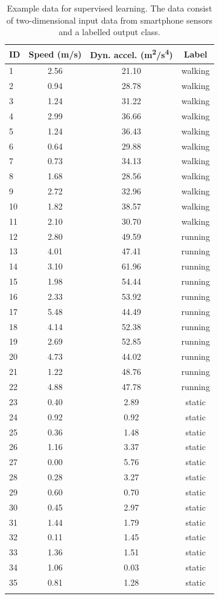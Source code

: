\begin{table}
\centering
\begin{tabular}{lccc}
\hline\noalign{\smallskip}
\textbf{ID} & \textbf{Speed (m/s)} & \textbf{Dyn. accel. (m\textsuperscript{2}/s\textsuperscript{4})} & \textbf{Label}\\
\hline\noalign{\smallskip}
1 & 2.56 & 21.10 & walking\\
2 & 0.94 & 28.78 & walking\\
3 & 1.24 & 31.22 & walking\\
4 & 2.99 & 36.66 & walking\\
5 & 1.24 & 36.43 & walking\\
6 & 0.64 & 29.88 & walking\\
7 & 0.73 & 34.13 & walking\\
8 & 1.68 & 28.56 & walking\\
9 & 2.72 & 32.96 & walking\\
10 & 1.82 & 38.57 & walking\\
11 & 2.10 & 30.70 & walking\\
12 & 2.80 & 49.59 & running\\
13 & 4.01 & 47.41 & running\\
14 & 3.10 & 61.96 & running\\
15 & 1.98 & 54.44 & running\\
16 & 2.33 & 53.92 & running\\
17 & 5.48 & 44.49 & running\\
18 & 4.14 & 52.38 & running\\
19 & 2.69 & 52.85 & running\\
20 & 4.73 & 44.02 & running\\
21 & 1.22 & 48.76 & running\\
22 & 4.88 & 47.78 & running\\
23 & 0.40 & 2.89 & static\\
24 & 0.92 & 0.92 & static\\
25 & 0.36 & 1.48 & static\\
26 & 1.16 & 3.37 & static\\
27 & 0.00 & 5.76 & static\\
28 & 0.28 & 3.27 & static\\
29 & 0.60 & 0.70 & static\\
30 & 0.45 & 2.97 & static\\
31 & 1.44 & 1.79 & static\\
32 & 0.11 & 1.45 & static\\
33 & 1.36 & 1.51 & static\\
34 & 1.06 & 0.03 & static\\
35 & 0.81 & 1.28 & static\\
\hline\noalign{\smallskip}
%
\end{tabular}
\caption[Example data for supervised learning]{Example data for supervised learning. The data consist of two-dimensional input data from smartphone sensors and a labelled output class.}\label{table:data-from-phone}
\end{table}
